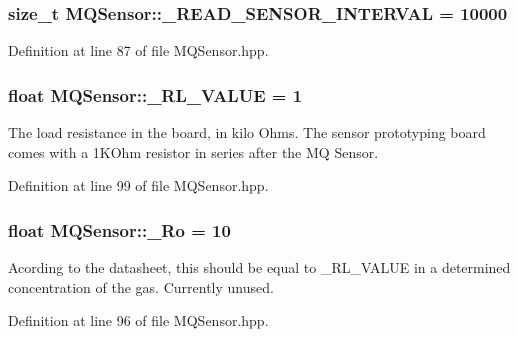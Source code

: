 \subsubsection[{\texorpdfstring{\+\_\+\+R\+E\+A\+D\+\_\+\+S\+E\+N\+S\+O\+R\+\_\+\+I\+N\+T\+E\+R\+V\+AL}{_READ_SENSOR_INTERVAL}}]{\setlength{\rightskip}{0pt plus 5cm}size\+\_\+t M\+Q\+Sensor\+::\+\_\+\+R\+E\+A\+D\+\_\+\+S\+E\+N\+S\+O\+R\+\_\+\+I\+N\+T\+E\+R\+V\+AL = 10000\hspace{0.3cm}{\ttfamily [protected]}}\hypertarget{class_m_q_sensor_a4a8e710f1bc61afb702d26ceb1366f11}{}\label{class_m_q_sensor_a4a8e710f1bc61afb702d26ceb1366f11}


Definition at line 87 of file M\+Q\+Sensor.\+hpp.

\subsubsection[{\texorpdfstring{\+\_\+\+R\+L\+\_\+\+V\+A\+L\+UE}{_RL_VALUE}}]{\setlength{\rightskip}{0pt plus 5cm}float M\+Q\+Sensor\+::\+\_\+\+R\+L\+\_\+\+V\+A\+L\+UE = 1\hspace{0.3cm}{\ttfamily [protected]}}\hypertarget{class_m_q_sensor_a2cf9585b95f5beaac2dc8edbab7eff42}{}\label{class_m_q_sensor_a2cf9585b95f5beaac2dc8edbab7eff42}
The load resistance in the board, in kilo Ohms. The sensor prototyping board comes with a 1\+K\+Ohm resistor in series after the MQ Sensor. 

Definition at line 99 of file M\+Q\+Sensor.\+hpp.

\subsubsection[{\texorpdfstring{\+\_\+\+Ro}{_Ro}}]{\setlength{\rightskip}{0pt plus 5cm}float M\+Q\+Sensor\+::\+\_\+\+Ro = 10\hspace{0.3cm}{\ttfamily [protected]}}\hypertarget{class_m_q_sensor_ade2e483ebc557d1caf753d41a8b3afde}{}\label{class_m_q_sensor_ade2e483ebc557d1caf753d41a8b3afde}
Acording to the datasheet, this should be equal to \+\_\+\+R\+L\+\_\+\+V\+A\+L\+UE in a determined concentration of the gas. Currently unused. 

Definition at line 96 of file M\+Q\+Sensor.\+hpp.

